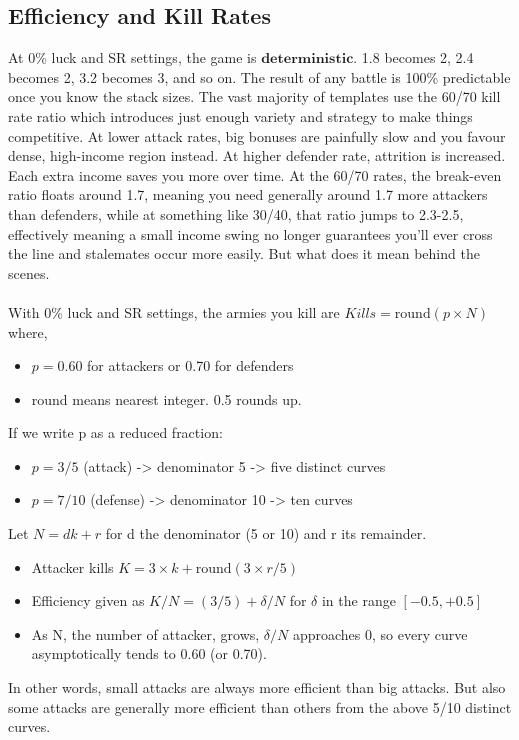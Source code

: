 \subsection{Efficiency and Kill Rates}

At 0\% luck and SR settings, the game is $\textbf{deterministic}$. 1.8 becomes 2, 2.4 becomes 2, 3.2 becomes 3, and so on. The result of any battle is 100\% predictable once you know the stack sizes. The vast majority of templates use the 60/70 kill rate ratio which introduces just enough variety and strategy to make things competitive. At lower attack rates, big bonuses are painfully slow and you favour dense, high-income region instead. At higher defender rate, attrition is increased. Each extra income saves you more over time. At the 60/70 rates, the break-even ratio floats around 1.7, meaning you need generally around 1.7 more attackers than defenders, while at something like 30/40, that ratio jumps to 2.3-2.5, effectively meaning a small income swing no longer guarantees you'll ever cross the line and stalemates occur more easily. But what does it mean behind the scenes. 
\\
\\
With 0\% luck and SR settings, the armies you kill are $Kills = \text{round}(p \times N)$ where, 
\begin{itemize}
    \item $p=0.60$ for attackers or 0.70 for defenders
    \item round means nearest integer. 0.5 rounds up.
\end{itemize}
If we write p as a reduced fraction:
\begin{itemize}
    \item $p = 3/5$ (attack) -> denominator 5 -> five distinct curves
    \item $p = 7/10$ (defense) -> denominator 10 -> ten curves
\end{itemize}
Let $N = dk + r$ for d the denominator (5 or 10) and r its remainder.
\begin{itemize}
    \item Attacker kills $K = 3\times k + \text{round}(3 \times r / 5)$
    \item Efficiency given as $K/N = (3/5) + \delta / N$ for $\delta$ in the range $[-0.5, +0.5]$
    \item As N, the number of attacker, grows, $\delta / N$ approaches 0, so every curve asymptotically tends to 0.60 (or 0.70).
\end{itemize}
In other words, small attacks are always more efficient than big attacks. But also some attacks are generally more efficient than others from the above 5/10 distinct curves.

